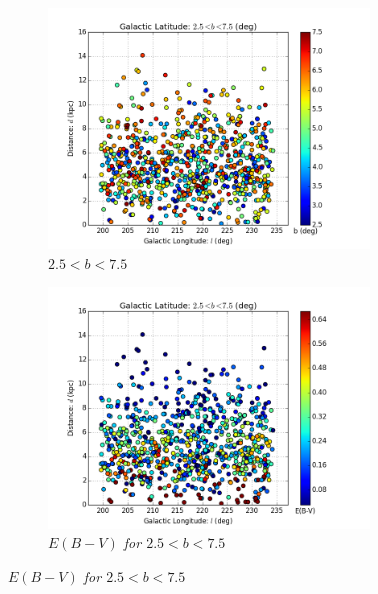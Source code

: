 \documentclass[aps,prb,twocolumn,superscriptaddress]{revtex4-1}
\begin{document}
\begin{figure}
	\centering
	\begin{subfigure}{.5\textwidth}
	  \centering
	  \includegraphics[width=3.35in]{figures/PlotsSpace15/dist_b_lp_limit15.png}
		\caption{\it \small{$2.5 < b < 7.5$ }}
		\label{fig:blp}
	\end{subfigure}%
	\begin{subfigure}{.5\textwidth}
	  \centering
			\includegraphics[width=3.35in]{figures/PlotsSpace15/dist_EBV_lp_limit15.png}
		\caption{\it \small{$E(B-V)$ for $2.5 < b < 7.5$ }}
		\label{fig:EBVlp}
	\end{subfigure}%
	

\end{figure}
\end{document}
